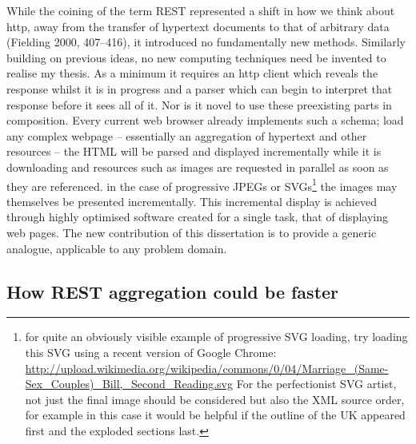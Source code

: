 \documentclass[12pt, ]{article}
\begin{document}
While the coining of the term REST represented a shift in how we think
about http, away from the transfer of hypertext documents to that of
arbitrary data (Fielding 2000, 407--416), it introduced no fundamentally
new methods. Similarly building on previous ideas, no new computing
techniques need be invented to realise my thesis. As a minimum it
requires an http client which reveals the response whilst it is in
progress and a parser which can begin to interpret that response before
it sees all of it. Nor is it novel to use these preexisting parts in
composition. Every current web browser already implements such a schema;
load any complex webpage -- essentially an aggregation of hypertext and
other resources -- the HTML will be parsed and displayed incrementally
while it is downloading and resources such as images are requested in
parallel as soon as they are referenced. in the case of progressive
JPEGs or SVGs\footnote{for quite an obviously visible example of
  progressive SVG loading, try loading this SVG using a recent version
  of Google Chrome:
  \url{http://upload.wikimedia.org/wikipedia/commons/0/04/Marriage_(Same-Sex_Couples)_Bill,_Second_Reading.svg}
  For the perfectionist SVG artist, not just the final image should be
  considered but also the XML source order, for example in this case it
  would be helpful if the outline of the UK appeared first and the
  exploded sections last.} the images may themselves be presented
incrementally. This incremental display is achieved through highly
optimised software created for a single task, that of displaying web
pages. The new contribution of this dissertation is to provide a generic
analogue, applicable to any problem domain.

\subsection{How REST aggregation could be
faster}\label{how-rest-aggregation-could-be-faster}
\end{document}
